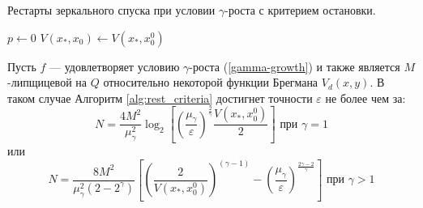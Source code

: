     \begin{algorithm}[htp]
        \caption{Рестарты зеркального спуска при условии $\gamma$-роста с критерием остановки.}
        \label{alg:rest_criteria}
        $p \gets 0$\;
        $V(x_*, x_0) \gets V(x_*,x_0^0)$\;
    \end{algorithm}
    \begin{theorem}
        Пусть $f$ --- удовлетворяет условию $\gamma$-роста (\ref{gamma-growth}) и также является $M$-липщицевой на $Q$ относительно некоторой функции Брегмана $V_d(x, y)$. В таком случае Алгоритм \ref{alg:rest_criteria} достигнет точности $\varepsilon$ не более чем за:
        \begin{equation}
           N =  \frac{4 M^2}{\mu_{\gamma}^2} \log_2{\left[\left(\frac{\mu_{\gamma}}{\varepsilon}\right)^{\frac{2}{\gamma}} \frac{V(x_*, x_0^0)}{2}\right]} \text{ при } \gamma = 1
       \end{equation}
       или
       \begin{equation}
           N = \frac{8  M^2}{\mu_{\gamma}^2 (2 - 2^{\gamma})} \left[ \left(\frac{2}{V(x_*, x_0^0)}\right)^{(\gamma - 1)}  - \left(\frac{\mu_{\gamma}}{\varepsilon}\right)^{\frac{2\gamma - 2}{\gamma}} \right] \text{ при } \gamma > 1
       \end{equation}
    \end{theorem}
    \textbf{}
